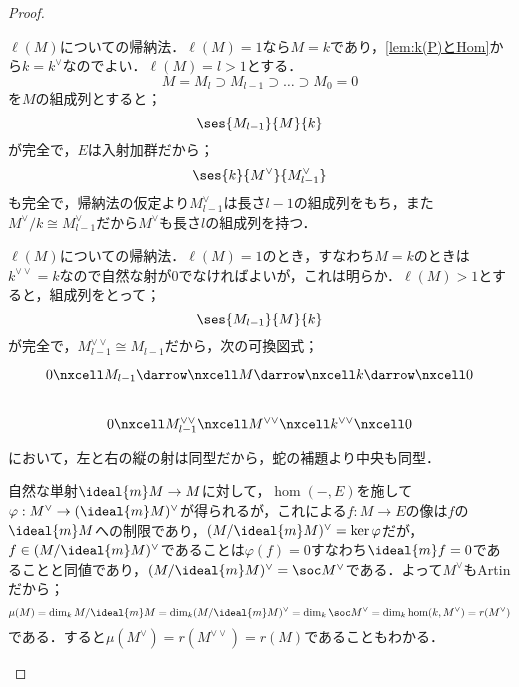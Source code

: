 \begin{proof}
	\begin{sakura}
	\item $\ell(M)$についての帰納法．$\ell(M)=1$なら$M=k$であり，\ref{lem:k(P)とHom}から$k=k^\vee$なのでよい．$\ell(M)=l>1$とする．
	\[M=M_l\supset M_{l-1}\supset\dots\supset M_0=0\]
	を$M$の組成列とすると；
	\[\ses{M_{l-1}}{M}{k}\]
	が完全で，$E$は入射加群だから；
	\[\ses{k}{M^\vee}{M_{l-1}^\vee}\]
	も完全で，帰納法の仮定より$M_{l-1}^\vee$は長さ$l-1$の組成列をもち，また$M^\vee/k\cong M_{l-1}^\vee$だから$M^\vee$も長さ$l$の組成列を持つ．

	\item$\ell(M)$についての帰納法．$\ell(M)=1$のとき，すなわち$M=k$のときは$k^{\vee\vee}=k$なので自然な射が$0$でなければよいが，これは明らか．$\ell(M)>1$とすると，組成列をとって；
	\[\ses{M_{l-1}}{M}{k}\]
	が完全で，$M_{l-1}^{\vee\vee}\cong M_{l-1}$だから，次の可換図式；
	\[\begin{tikzcd}
	0\nxcell M_{l-1}\darrow\nxcell M\darrow\nxcell k\darrow\nxcell0\\
	0\nxcell M_{l-1}^{\vee\vee}\nxcell M^{\vee\vee}\nxcell k^{\vee\vee}\nxcell0
	\end{tikzcd}\]
	において，左と右の縦の射は同型だから，蛇の補題より中央も同型．
	
	\item 自然な単射$\ideal{m}M\to M$に対して，$\hom(-,E)$を施して$\varphi:M^\vee\to(\ideal{m}M)^\vee$が得られるが，これによる$f:M\to E$の像は$f$の$\ideal{m}M$への制限であり，$(M/\ideal{m}M)^\vee=\ker\varphi$だが，$f\in(M/\ideal{m}M)^\vee$であることは$\varphi(f)=0$すなわち$\ideal{m}f=0$であることと同値であり，$(M/\ideal{m}M)^\vee=\soc M^\vee$である．よって$M^\vee$もArtinだから；
	\[\mu(M)=\dim_k M/\ideal{m}M=\dim_k (M/\ideal{m}M)^\vee=\dim_k\soc M^\vee=\dim_k\hom(k,M^\vee)=r(M^\vee)\]
	である．すると$\mu(M^\vee)=r(M^{\vee\vee})=r(M)$であることもわかる．
	\end{sakura}
\end{proof}

%

